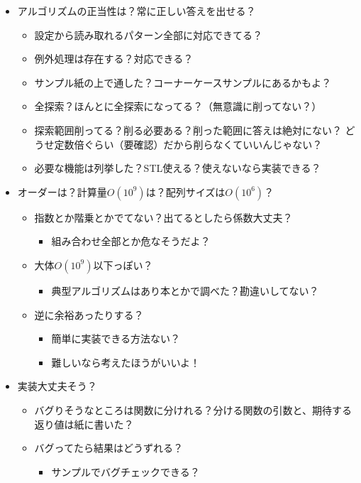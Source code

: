 \documentclass{jsarticle}
\begin{document}
\begin{enumerate}
\begin{itemize}
    \item アルゴリズムの正当性は？常に正しい答えを出せる？
    \begin{itemize}
      \item 設定から読み取れるパターン全部に対応できてる？
      \item 例外処理は存在する？対応できる？
      \item サンプル紙の上で通した？コーナーケースサンプルにあるかもよ？
      \item 全探索？ほんとに全探索になってる？（無意識に削ってない？）
      \item 探索範囲削ってる？削る必要ある？削った範囲に答えは絶対にない？
      \newline どうせ定数倍ぐらい（要確認）だから削らなくていいんじゃない？
      \item 必要な機能は列挙した？STL使える？使えないなら実装できる？
    \end{itemize}
    \item オーダーは？計算量$O(10^9)$は？配列サイズは$O(10^6)$？
    \begin{itemize}
      \item 指数とか階乗とかでてない？出てるとしたら係数大丈夫？
      \begin{itemize}
        \item 組み合わせ全部とか危なそうだよ？
      \end{itemize}
      \item 大体$O(10^9)$以下っぽい？
      \begin{itemize}
        \item 典型アルゴリズムはあり本とかで調べた？勘違いしてない？
      \end{itemize}
      \item 逆に余裕あったりする？
      \begin{itemize}
        \item 簡単に実装できる方法ない？
        \item 難しいなら考えたほうがいいよ！
      \end{itemize}
    \end{itemize}
    \item 実装大丈夫そう？
    \begin{itemize}
      \item バグりそうなところは関数に分けれる？分ける関数の引数と、期待する返り値は紙に書いた？
      \item バグってたら結果はどうずれる？
      \begin{itemize}
        \item サンプルでバグチェックできる？

\end{itemize}
\end{itemize}
\end{itemize}
\end{enumerate}
\end{document}
